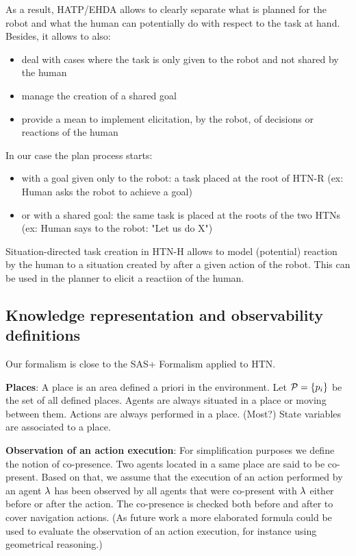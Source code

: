 \documentclass[letterpaper]{article} %
\begin{document}
As a result, HATP/EHDA allows to clearly separate what is planned for the robot and what the human can potentially do with respect to the task at hand. Besides, it allows to also:
\begin{itemize}
    \item deal with cases where the task is only given to the robot and not shared by the human
    \item manage the creation of a shared goal
    \item provide a mean to implement elicitation, by the robot, of decisions or reactions of the human
\end{itemize}
In our case the plan process starts:
\begin{itemize}
   \item with a goal given only to the robot: a task placed at the root of HTN-R (ex: Human asks the robot to achieve a goal)
   \item or with a shared goal: the same task is placed at the roots of  the two HTNs (ex: Human says to the robot: "Let us do X")
\end{itemize}

Situation-directed task creation in HTN-H allows to model (potential) reaction by the human to a situation created by after a given action of the robot. This can be used in the planner to elicit a reactiion of the human.

\subsection{Knowledge representation and observability definitions}

Our formalism is close to the SAS+ Formalism applied to HTN.  

\textbf{Places}: 
A place is an area defined a priori in the environment. Let $\mathcal{P}=\{ p_i \}$ be the set of all defined places. Agents are always situated in a place or moving between them. Actions are always performed in a place. (Most?) State variables are associated to a place.

\textbf{Observation of an action execution}: 
For simplification purposes we define the notion of co-presence. Two agents located in a same place are said to be co-present.
Based on that, we assume that the execution of an action performed by an agent $\lambda$ has been observed by all agents that were co-present with $\lambda$ either before or after the action. The co-presence is checked both before and after to cover navigation actions.
(As future work a more elaborated formula could be used to evaluate the observation of an action execution, for instance using geometrical reasoning.)
\end{document}
